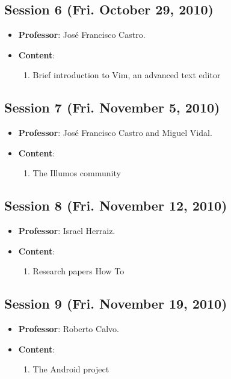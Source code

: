 \documentclass[a4paper]{article}
\begin{document}
\subsection{Session 6 (Fri. October 29, 2010)}

\begin{itemize}
 \item \textbf{Professor}: José Francisco Castro.

 \item \textbf{Content}:

 \begin{enumerate}
  \item Brief introduction to Vim, an advanced text editor
 \end{enumerate}

\end{itemize}

\subsection{Session 7 (Fri. November 5, 2010)}

\begin{itemize}
 \item \textbf{Professor}: José Francisco Castro and Miguel Vidal.

 \item \textbf{Content}:

 \begin{enumerate}
  \item The Illumos community
 \end{enumerate}

\end{itemize}

\subsection{Session 8 (Fri. November 12, 2010)}

\begin{itemize}
 \item \textbf{Professor}: Israel Herraiz.

 \item \textbf{Content}:

 \begin{enumerate}
  \item Research papers How To
 \end{enumerate}

\end{itemize}

\subsection{Session 9 (Fri. November 19, 2010)}

\begin{itemize}
 \item \textbf{Professor}: Roberto Calvo.

 \item \textbf{Content}:

 \begin{enumerate}
  \item The Android project
 \end{enumerate}

\end{itemize}
\end{document}
